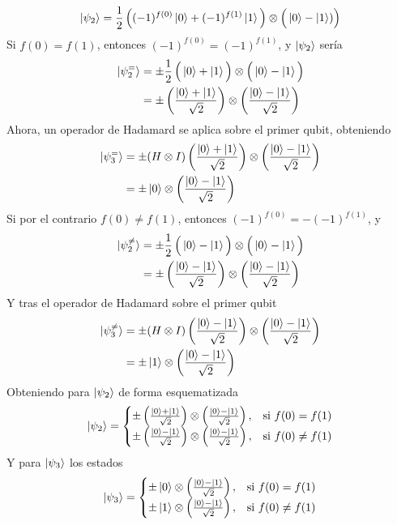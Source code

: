 $$
\ket{\psi_{2}} = \frac{1}{2} \, \Big((-1)^{f(0)} \ket{0} + (-1)^{f(1)}\ket 1 \Big) 
\otimes \Big(\ket 0 - \ket 1) \Big)
$$
Si $f(0) = f(1)$, entonces $(-1)^{f(0)} = (-1)^{f(1)}$, y $\ket{\psi_{2}}$ sería
\begin{equation*}
\begin{split}
\ket{\psi_2^=} & = \pm \frac{1}{2} \, \Big(\ket 0 + \ket 1 \Big) \otimes 
\Big(\ket 0 - \ket 1 \Big) \\
& = \pm\left(\frac{\ket 0 + \ket 1}{\sqrt 2 } \right)
\otimes \left( \frac{\ket 0 -\ket 1}{\sqrt 2 } \right)
\end{split}
\end{equation*}
Ahora, un operador de Hadamard se aplica sobre el primer qubit, obteniendo
\begin{equation*}
\begin{split}
\ket{\psi_3^=}& = \pm (H\otimes I) \left(\frac{\ket 0 + \ket 1}{\sqrt 2 } 
\right)
\otimes \left( \frac{\ket 0 -\ket 1}{\sqrt 2 } \right) \\
&= \pm \ket 0 \otimes \left( \frac{\ket 0 -\ket 1}{\sqrt 2 } \right)
\end{split}
\end{equation*}
Si por el contrario $f(0) \neq f(1)$, entonces $(-1)^{f(0)} = - (-1)^{f(1)}$, y
\begin{equation*}
\begin{split}
\ket{\psi_2^{\neq}} & = \pm \frac{1}{2} \, \Big(\ket 0 - \ket 1 \Big) \otimes 
\Big(\ket 0 - \ket 1 \Big) \\
& = \pm\left(\frac{\ket 0 - \ket 1}{\sqrt 2 } \right)
\otimes \left( \frac{\ket 0 -\ket 1}{\sqrt 2 } \right)
\end{split}
\end{equation*}
Y tras el operador de Hadamard sobre el primer qubit
\begin{equation*}
\begin{split}
\ket{\psi_3^{\neq}}& = \pm (H\otimes I) \left(\frac{\ket 0 - \ket 1}{\sqrt 2 } 
\right)
\otimes \left( \frac{\ket 0 -\ket 1}{\sqrt 2 } \right) \\
&= \pm \ket 1 \otimes \left( \frac{\ket 0 -\ket 1}{\sqrt 2 } \right)
\end{split}
\end{equation*}
Obteniendo para $\ket{\psi_{2}}$ de forma esquematizada
$$
\ket{\psi_2} = 
\begin{cases}
\pm\left(\frac{\ket 0 + \ket 1}{\sqrt 2 } \right)
\otimes \left( \frac{\ket 0 -\ket 1}{\sqrt 2 } \right)
, & \text{si}\ f(0) = f(1) \\
\pm\left(\frac{\ket 0 - \ket 1}{\sqrt 2 } \right)
\otimes \left( \frac{\ket 0 -\ket 1}{\sqrt 2 } \right)
, & \text{si}\ f(0) \neq f(1)
\end{cases}
$$
Y para $\ket{\psi_{3}}$ los estados
$$
\ket{\psi_{3}} =
\begin{cases}
\pm \ket 0 \otimes \left( \frac{\ket 0 -\ket 1}{\sqrt 2 } \right)
, & \text{si}\ f(0) = f(1) \\
\pm \ket 1 \otimes \left( \frac{\ket 0 -\ket 1}{\sqrt 2 } \right)
, & \text{si}\ f(0) \neq f(1)
\end{cases}
$$


